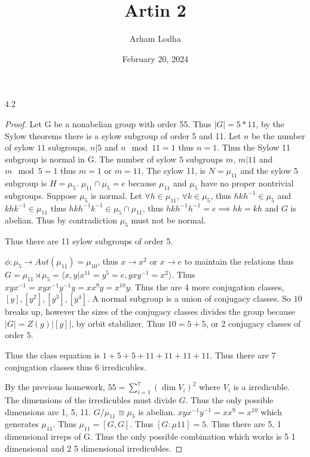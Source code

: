 \documentclass{article}
\newcommand{\angles}[1]{\langle #1 \rangle}
\begin{document}
\title{Artin 2}
\author{Arham Lodha}%
\date{February 20, 2024}%
\maketitle

\begin{PROB}{4.2}\label{Problem 4.2.}
\end{PROB}
\begin{proof}
    Let G be a nonabelian group with order 55. Thus $|G| = 5 * 11$, by the Sylow theorems there is a sylow subgroup of order 5 and 11. Let $n$ be the number of sylow $11$ subgroups, $n | 5$ and $n \mod 11 = 1$ thus $n = 1$. Thus the Sylow 11 subgroup is normal in G. The number of sylow $5$ subgroups $m$, $m | 11$ and $m \mod 5 = 1$ thus $m = 1$ or $m = 11$. The sylow 11, is $N = \mu_{11}$ and the sylow 5 subgroup is $H = \mu_{5}$. $\mu_{11} \cap \mu_5 = e$ because $\mu_{11}$ and $\mu_5$ have no proper nontrivial subgroups. Suppose $\mu_5$ is normal. Let $\forall h \in \mu_{11}$, $\forall k \in \mu_5$, thus $hkh^{-1} \in \mu_5$ and $khk^{-1} \in \mu_{11}$ thus $hkh^{-1}k^{-1} \in \mu_5 \cap \mu_{11}$, thus $hkh^{-1}h^{-1} = e \implies hk=kh$ and $G$ is abelian. Thus by contradiction $\mu_5$ must not be normal. 
    
    Thus there are 11 sylow subgroups of order 5.   

    $\phi: \mu_5 \to Aut(\mu_{11}) = \mu_{10}$, thus $x \to x^2$ or $x \to e$ to maintain the relations thus $G = \mu_{11} \rtimes \mu_{5} = \angles{x, y | x^{11} = y^{5} = e, yxy^{-1} = x^2}$. Thus $xyx^{-1} = x y x^{-1}y^{-1} y = x x^{9}y = x^{10}y$. Thus the are 4 more conjugation classes, $[y], [y^2], [y^3], [y^4]$. A normal subgroup is a union of conjugacy classes. So $10$ breaks up, however the sizes of the conjugacy classes divides the group because $|G| = Z(g)|[g]|$, by orbit stabilizer. Thus $10 = 5 +5$, or 2 conjugacy classes of order 5.     
    
    Thus the class equation is $1 + 5 + 5 + 11 + 11+ 11 + 11$. Thus there are 7 conjugation classes thus 6 irredicubles. 
    
    By the previous homework, $55 = \sum_{i = 1}^{7} (\dim V_i)^2$ where $V_i$ is a irredicuble. The dimensions of the irredicubles must divide $G$. Thus the only possible dimensions are 1, 5, 11. $G / \mu_{11} \cong \mu_{5}$ is abelian. $xyx^{-1}y^{-1} = x x^{9}  =x^{10}$ which generates $\mu_{11}$. Thus $\mu_{11} = [G, G]$. Thus $[G: \mu{11}] = 5$. Thus there are 5, 1 dimensional irreps of G. Thus the only possible combination which works is 5 1 dimensional and 2 5 dimensional irredicubles.    
\end{proof}
\end{document}
